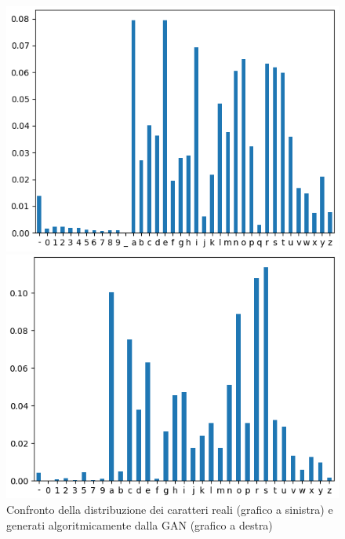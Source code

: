 \begin{figure}[!bp]
    \centering
    \begin{minipage}[t]{0.45\columnwidth}
		\includegraphics[width=\linewidth]{figures/all_legit_char_distr.png}
	\end{minipage}
	\begin{minipage}[b]{0.45\columnwidth}
		\includegraphics[width=\linewidth]{figures/chars_histogram.png}
	\end{minipage}
\caption{Confronto della distribuzione dei caratteri reali (grafico a sinistra) e generati algoritmicamente dalla GAN (grafico a destra) \label{fig:chardistr}}
\end{figure}


